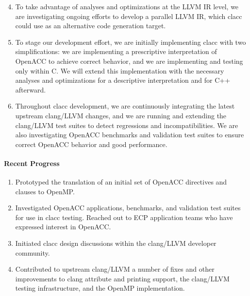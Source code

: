 \begin{enumerate}

\setcounter{enumi}{3}

\item To take advantage of analyses and optimizations at the LLVM IR level,
we are investigating ongoing efforts to develop a parallel LLVM IR, which
clacc could use as an alternative code generation target.

\item To stage our development effort, we are initially implementing clacc
with two simplifications: we are implementing a prescriptive interpretation
of OpenACC to achieve correct behavior, and we are implementing and testing
only within C.  We will extend this implementation with the necessary
analyses and optimizations for a descriptive interpretation and for C++
afterward.  

\item Throughout clacc development, we are continuously integrating the
latest upstream clang/LLVM changes, and we are running and extending the
clang/LLVM test suites to detect regressions and incompatibilities.  We are
also investigating OpenACC benchmarks \cite{specAccel} and validation test
suites \cite{openACCValidationSuite} to ensure correct OpenACC behavior and
good performance.


\end{enumerate}


\paragraph{Recent Progress}

\begin{enumerate}

\item Prototyped the translation of an initial set of OpenACC directives and
clauses to OpenMP.

\item Investigated OpenACC applications, benchmarks, and validation test
suites for use in clacc testing.  Reached out to ECP application teams who
have expressed interest in OpenACC.

\item Initiated clacc design discussions within the clang/LLVM developer
community.

\item Contributed to upstream clang/LLVM a number of fixes and other
improvements to clang attribute and printing support, the clang/LLVM testing
infrastructure, and the OpenMP implementation.

\end{enumerate}


